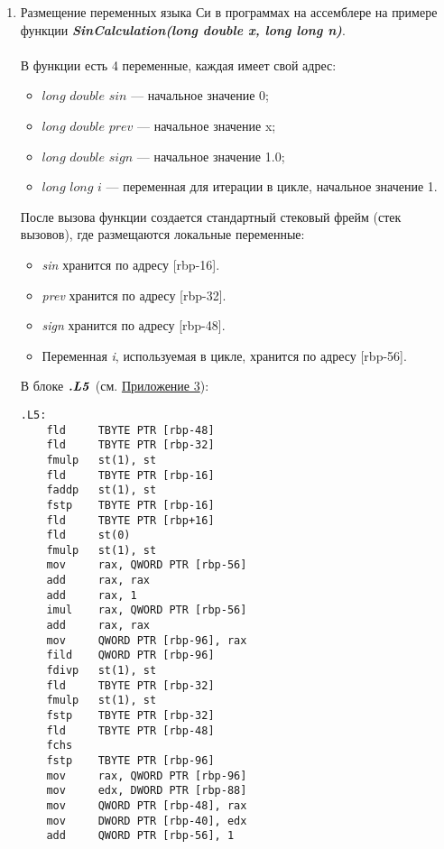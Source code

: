 \documentclass[12pt,a4paper]{article}
\numberwithin{subsection}{section}
\begin{document}
\begin{enumerate}
\item Размещение переменных языка Си в программах на ассемблере на примере 
функции \textbf{\textit{SinCalculation(long double x, long long n)}}.
\\
\\
В функции есть 4 переменные, каждая имеет свой адрес:
\begin{itemize}
    \item $\textit{long double sin}$ — начальное значение 0;
    \item $\textit{long double prev}$ — начальное значение x;
    \item $\textit{long double sign}$ — начальное значение 1.0;
    \item $\textit{long long i}$ — переменная для итерации в цикле, начальное значение 1.
\end{itemize}

После вызова функции создается стандартный стековый фрейм (стек вызовов), 
где размещаются локальные переменные:
\begin{itemize}
    \item \textit{sin} хранится по адресу [rbp-16].
    \item \textit{prev} хранится по адресу [rbp-32].
    \item \textit{sign} хранится по адресу [rbp-48].
    \item Переменная \textit{i}, используемая в цикле, хранится по адресу [rbp-56].
\end{itemize}

В блоке $\textbf{\textit{.L5}}$ (см. \hyperref[app:app3]{Приложение 3}):

\begin{lstlisting}
.L5:
    fld     TBYTE PTR [rbp-48]
    fld     TBYTE PTR [rbp-32]
    fmulp   st(1), st
    fld     TBYTE PTR [rbp-16]
    faddp   st(1), st
    fstp    TBYTE PTR [rbp-16]
    fld     TBYTE PTR [rbp+16]
    fld     st(0)
    fmulp   st(1), st
    mov     rax, QWORD PTR [rbp-56]
    add     rax, rax
    add     rax, 1
    imul    rax, QWORD PTR [rbp-56]
    add     rax, rax
    mov     QWORD PTR [rbp-96], rax
    fild    QWORD PTR [rbp-96]
    fdivp   st(1), st
    fld     TBYTE PTR [rbp-32]
    fmulp   st(1), st
    fstp    TBYTE PTR [rbp-32]
    fld     TBYTE PTR [rbp-48]
    fchs
    fstp    TBYTE PTR [rbp-96]
    mov     rax, QWORD PTR [rbp-96]
    mov     edx, DWORD PTR [rbp-88]
    mov     QWORD PTR [rbp-48], rax
    mov     DWORD PTR [rbp-40], edx
    add     QWORD PTR [rbp-56], 1
\end{lstlisting}


\end{enumerate}
\end{document}
